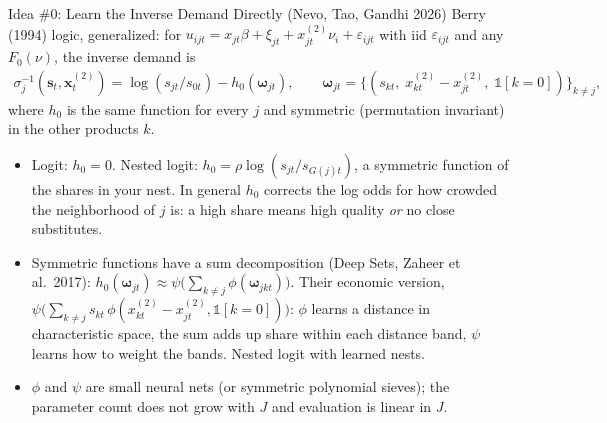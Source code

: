 \documentclass[aspectratio=169,10pt]{beamer}
\begin{document}
\begin{frame}{Idea \#0: Learn the Inverse Demand Directly (Nevo, Tao, Gandhi 2026)}
\small
Berry (1994) logic, generalized: for $u_{ijt} = x_{jt}\beta + \xi_{jt} + x^{(2)}_{jt}\nu_i + \varepsilon_{ijt}$ with iid $\varepsilon_{ijt}$ and \alert{any} $F_0(\nu)$, the inverse demand is
\begin{align*}
\sigma_j^{-1}(\symbf{s}_t, \symbf{x}^{(2)}_t) = \log(s_{jt}/s_{0t}) - h_0(\symbf{\omega}_{jt}), \qquad \symbf{\omega}_{jt} = \bigl\{(s_{kt},\; x^{(2)}_{kt}-x^{(2)}_{jt},\; \mathbb{1}[k=0])\bigr\}_{k \neq j},
\end{align*}
where $h_0$ is the \alert{same function for every $j$} and \alert{symmetric} (permutation invariant) in the other products $k$.
\begin{itemize}
\item Logit: $h_0 = 0$. Nested logit: $h_0 = \rho \log(s_{jt}/s_{G(j)t})$, a symmetric function of the shares in your nest. In general $h_0$ corrects the log odds for \alert{how crowded the neighborhood of $j$ is}: a high share means high quality \emph{or} no close substitutes.
\item Symmetric functions have a sum decomposition (\alert{Deep Sets}, Zaheer et al.\ 2017): $h_0(\symbf{\omega}_{jt}) \approx \psi\bigl(\sum_{k \neq j} \phi(\symbf{\omega}_{jkt})\bigr)$. Their economic version, $\psi\bigl(\sum_{k \neq j} s_{kt}\, \phi(x^{(2)}_{kt}-x^{(2)}_{jt}, \mathbb{1}[k=0])\bigr)$: $\phi$ learns a \alert{distance} in characteristic space, the sum adds up share within each distance band, $\psi$ learns how to weight the bands. Nested logit with learned nests.
\item $\phi$ and $\psi$ are small neural nets (or symmetric polynomial sieves); the parameter count does not grow with $J$ and evaluation is linear in $J$.
\end{itemize}
\end{frame}
\end{document}
